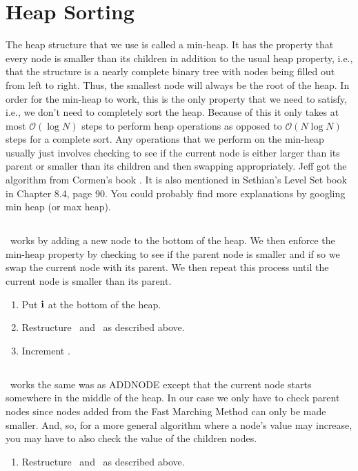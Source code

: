 \section{Heap Sorting}\label{Sec:Heap Sorting}
The heap structure that we use is called a min-heap. It has the property that every node is smaller than its children in addition to the usual heap property, i.e., that the structure is a nearly complete binary tree with nodes being filled out from left to right. Thus, the smallest node will always be the root of the heap. In order for the min-heap to work, this is the only property that we need to satisfy, i.e., we don't need to completely sort the heap. Because of this it only takes at most $\mathcal O(\log N)$ steps to perform heap operations as opposed to $\mathcal O(N\log N)$ steps for a complete sort. Any operations that we perform on the min-heap usually just involves checking to see if the current node is either larger than its parent or smaller than its children and then swapping appropriately.  Jeff got the algorithm from Cormen's book \cite{Cormen2001}. It is also mentioned in Sethian's Level Set book \cite{Sethian99} in Chapter 8.4, page 90.  You could probably find more explanations by googling min heap (or max heap).
\subsection{\ADDNODE}
\ADDNODE~works by adding a new node to the bottom of the heap. We then enforce the min-heap property by checking to see if the parent node is smaller and if so we swap the current node with its parent. We then repeat this process until the current node is smaller than its parent.
\begin{enumerate}
\item Put ${\bf i}$ at the bottom of the heap.
\item Restructure \heap~and \heaploc~as described above.
\item Increment \numtent.
\end{enumerate}
\subsection{\UPDATENODE}
\UPDATENODE~works the same was as ADDNODE except that the current node starts somewhere in the middle of the heap. In our case we only have to check parent nodes since nodes added from the Fast Marching Method can only be made smaller. And, so, for a more general algorithm where a node's value may increase, you may have to also check the value of the children nodes.
\begin{enumerate}
\item Restructure \heap~and \heaploc~as described above.
\end{enumerate}
